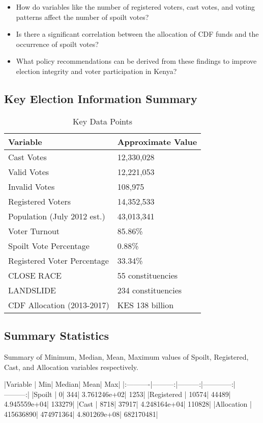\documentclass[fleqn,a4paper,12pt]{article}
\begin{document}
\begin{itemize}
\item How do variables like the number of registered voters, cast votes, and voting patterns affect the number of spoilt votes?
\item Is there a significant correlation between the allocation of CDF funds and the occurrence of spoilt votes?
\item What policy recommendations can be derived from these findings to improve election integrity and voter participation in Kenya?
\end{itemize}


\subsection{Key Election Information Summary}
\begin{frame}{}
\begin{table}[htb] %
  \centering
  \begin{tabular}{|l|l|}
    \hline
    \textbf{Variable} & \textbf{Approximate Value} \\
    \hline
    Cast Votes & 12,330,028 \\
    Valid Votes & 12,221,053 \\
    Invalid Votes & 108,975 \\
    Registered Voters & 14,352,533 \\
    Population (July 2012 est.) & 43,013,341 \\
    Voter Turnout & 85.86\% \\
    Spoilt Vote Percentage & 0.88\% \\
    Registered Voter Percentage & 33.34\% \\
    CLOSE RACE & 55 constituencies \\
    LANDSLIDE & 234 constituencies \\
    CDF Allocation (2013-2017) & KES 138 billion \\
    \hline
  \end{tabular}
  \caption{Key Data Points}
\end{table}
\end{frame}

\subsection{Summary Statistics}



Summary of Minimum, Median, Mean, Maximum values of Spoilt, Registered, Cast, and Allocation variables respectively.
 \\
\begin{Schunk}
\begin{Soutput}
|Variable   |       Min|    Median|         Mean|       Max|
|:----------|---------:|---------:|------------:|---------:|
|Spoilt     |         0|       344| 3.761246e+02|      1253|
|Registered |     10574|     44489| 4.945559e+04|    133279|
|Cast       |      8718|     37917| 4.248164e+04|    110828|
|Allocation | 415636890| 474971364| 4.801269e+08| 682170481|
\end{Soutput}
\end{Schunk}
\end{document}
